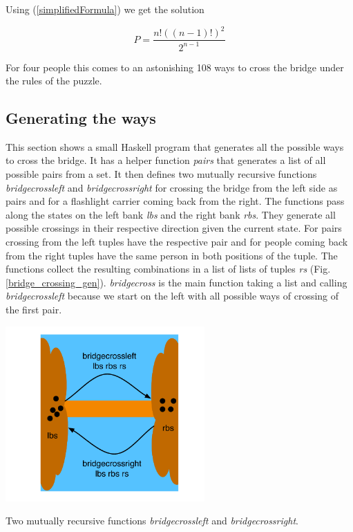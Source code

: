 \noindent Using  (\ref{simplifiedFormula}) we get the solution

\begin{equation}
P = \frac{n ! ((n - 1) !)^2}{2^{n - 1}} 
\end{equation}

For four people this comes to an astonishing 108 ways to cross the bridge under the rules of the puzzle.

\subsection{Generating the ways}

This section shows a small Haskell program that generates all the possible ways to cross the bridge.  It has a helper function \emph{pairs} that generates a list of all possible pairs from a set. It then defines two mutually recursive functions \emph{bridgecrossleft} and \emph{bridgecrossright} for crossing the bridge from the left side as pairs and for a flashlight carrier coming back from the right. The functions pass along the states on the left bank \emph{lbs} and the right bank \emph{rbs}.  They generate all possible crossings in their respective direction given the current state. For pairs crossing from the left tuples have the respective pair and for people coming back from the right tuples have the same person in both positions of the tuple. The functions collect the resulting combinations in a list of lists of tuples \emph{rs} (Fig. \ref{bridge_crossing_gen}). \emph{bridgecross} is the main function taking a list and calling \emph{bridgecrossleft} because we start on the left with all possible ways of crossing of the first pair. 

\begin{marginfigure}
\includegraphics[width=3in]{fig.pdf}
\caption{Two mutually recursive functions \emph{bridgecrossleft} and \emph{bridgecrossright}.}
	\label{bridge_crossing_gen}
\end{marginfigure}

